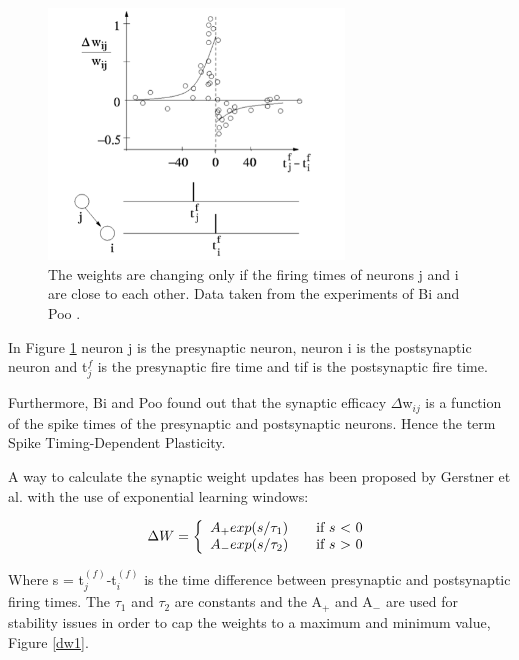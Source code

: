 \begin{figure}[h!]
\centering
\centering
\includegraphics[width=0.7\textwidth]{chapter2/bigpoo.png}
	\caption{ The weights are changing only if the firing times of neurons j and i are close to each other. Data taken from the experiments of Bi and Poo \cite{bigpoo}. }
	\label{bigpoo1}
\end{figure}

In Figure \ref{bigpoo1} neuron j is the presynaptic neuron, neuron i is the postsynaptic neuron and t$_{j}^{f}$ is the presynaptic fire time and tif is the postsynaptic fire time.

Furthermore, Bi and Poo \cite{bigpoo,bipoo2} found out that the synaptic efficacy $\Delta$w$_{ij}$ is a function of the spike times of the presynaptic and postsynaptic neurons. Hence the term Spike Timing-Dependent Plasticity.

	A way to calculate the synaptic weight updates has been proposed by Gerstner et al. \cite{gernstbook} with the use of exponential learning windows:

\begin{equation}
  \Delta W = \left\{ 
  \begin{array}{l l}
    A_{+}exp(s/\tau_{1}) & \quad \text{if $s$ < 0}\\
    A_{-}exp(s/\tau_{2}) & \quad \text{if $s$ > 0}\\
  \end{array} \right.
\end{equation}

Where s = t$_{j}^{(f)}$-t$_{i}^{(f)}$ is the time difference between presynaptic and postsynaptic firing times. The $\tau_{1}$ and $\tau_{2}$ are constants and the A$_{+}$ and A$_{-}$ are used for stability issues in order to cap the weights to a maximum and minimum value, Figure \ref{dw1}. 

